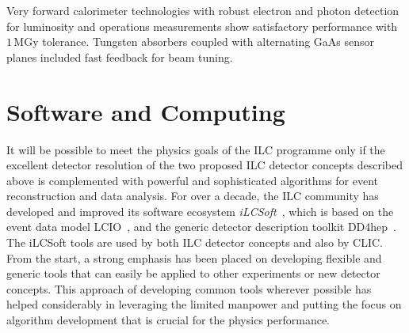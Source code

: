 \documentclass[%
 reprint,
 amsmath,amssymb,
 aps,
]{revtex4-1}
\newcommand{\todo}[1]{\textcolor{red}{{#1}}}
\begin{document}
Very forward calorimeter technologies with robust
electron and photon detection for luminosity
and operations measurements show satisfactory
performance with $1\,$MGy tolerance.
Tungsten absorbers coupled with alternating GaAs sensor planes
included fast feedback for beam tuning.







\vspace{-.4cm}

\section{\label{sec:soft}Software and Computing}

\vspace{-.3cm}

It will be possible to meet
the physics goals of the ILC programme only  if the excellent detector resolution
of the two proposed ILC detector concepts described above
 is complemented with powerful
and sophisticated algorithms for event reconstruction and data analysis.
For over a decade, the ILC community has developed and improved its
 software ecosystem \emph{iLCSoft}~\cite{bib:ilcsoft}, which
is based on the event data model LCIO~\cite{bib:lcio},
and the generic detector description toolkit DD4hep~\cite{bib:dd4hep}. 
The iLCSoft tools are used by both ILC detector concepts and also  by CLIC.
From the start, a strong emphasis has been placed on 
 developing flexible and generic tools that can easily be applied
to other experiments or new detector concepts. 
This approach of developing common tools wherever possible
has helped considerably in leveraging the limited manpower
 and putting the focus on algorithm development that
is crucial for the physics performance. 
\end{document}
